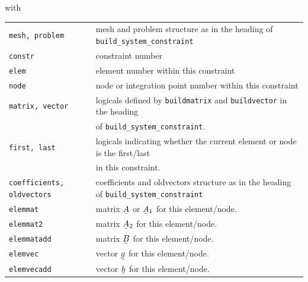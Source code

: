 with\\[2ex]
\begin{tabular}{ll}
\texttt{mesh, problem} & mesh and problem structure as in the heading of
                           \texttt{build\_system\_constraint}\\
\texttt{constr} & constraint number \\
\texttt{elem} & element number within this constraint \\
\texttt{node} & node or integration point number within this constraint\\
\texttt{matrix, vector} & logicals defined by \texttt{buildmatrix} and
                         \texttt{buildvector} in the heading \\
                        & of \texttt{build\_system\_constraint}.\\
\texttt{first, last} & logicals indicating whether the current element or node
    is the first/last \\ & in this constraint. \\
\texttt{coefficients, oldvectors} & coefficients and oldvectors structure as in the heading of
                           \texttt{build\_system\_constraint}\\
\texttt{elemmat} & matrix $\mat A$ or $\mat A_1$ for this element/node. \\
\texttt{elemmat2} & matrix $\mat A_2$ for this element/node. \\
\texttt{elemmatadd} & matrix $\mat B$ for this element/node. \\
\texttt{elemvec} & vector $\col g$ for this element/node. \\
\texttt{elemvecadd} & vector $\col h$ for this element/node. \\
\end{tabular}

